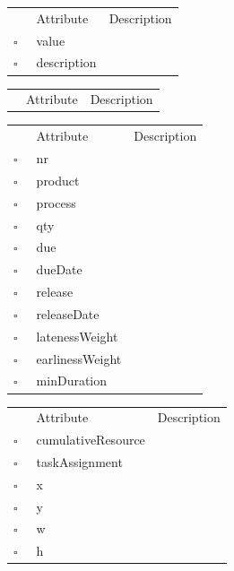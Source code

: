 \begin{table}
\caption{LowerBound  }

\begin{longtable}{llp{8cm}}
& Attribute & Description \\
$\square$\ & value &  \\
$\square$\ & description &  \\
\end{longtable}
\label{attr:LowerBound}
\end{table}

\begin{table}
\caption{MachineGroupLowerBound  }

\begin{longtable}{llp{8cm}}
& Attribute & Description \\
\end{longtable}
\label{attr:MachineGroupLowerBound}
\end{table}

\begin{table}
\caption{Order  }

\begin{longtable}{llp{8cm}}
& Attribute & Description \\
$\square$\ & nr &  \\
$\square$\ & product &  \\
$\square$\ & process &  \\
$\square$\ & qty &  \\
$\square$\ & due &  \\
$\square$\ & dueDate &  \\
$\square$\ & release &  \\
$\square$\ & releaseDate &  \\
$\square$\ & latenessWeight &  \\
$\square$\ & earlinessWeight &  \\
$\square$\ & minDuration &  \\
\end{longtable}
\label{attr:Order}
\end{table}

\clearpage
\begin{table}
\caption{PlacedRectangle  }

\begin{longtable}{llp{8cm}}
& Attribute & Description \\
$\square$\ & cumulativeResource &  \\
$\square$\ & taskAssignment &  \\
$\square$\ & x &  \\
$\square$\ & y &  \\
$\square$\ & w &  \\
$\square$\ & h &  \\
\end{longtable}
\label{attr:PlacedRectangle}
\end{table}

